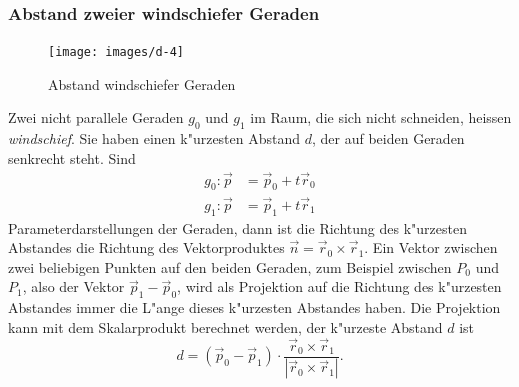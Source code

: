 \subsubsection{Abstand zweier windschiefer Geraden}
\begin{figure}
\begin{center}
\texttt{[image: images/d-4]}
\end{center}
\caption{Abstand windschiefer Geraden\label{windschief}}
\end{figure}
Zwei nicht parallele Geraden $g_0$ und $g_1$ im Raum,
die sich nicht schneiden, heissen
{\em windschief}. 
Sie haben
einen k"urzesten Abstand $d$, der auf beiden Geraden senkrecht steht.
Sind
\begin{align*}
g_0:
\vec p&=\vec p_0+t\vec r_0\\
g_1:
\vec p&=\vec p_1+t\vec r_1
\end{align*}
Parameterdarstellungen der Geraden, dann ist die Richtung des k"urzesten
Abstandes die Richtung des Vektorproduktes $\vec n = \vec r_0\times\vec r_1$. 
Ein Vektor zwischen zwei beliebigen Punkten auf den beiden Geraden,
zum Beispiel zwischen $P_0$ und $P_1$, also der Vektor $\vec p_1-\vec p_0$,
wird als Projektion auf die Richtung des k"urzesten Abstandes immer die
L"ange dieses k"urzesten Abstandes haben. Die Projektion kann mit dem
Skalarprodukt berechnet werden, der k"urzeste Abstand $d$ ist
\[
d=(\vec p_0-\vec p_1)\cdot\frac{\vec r_0\times\vec r_1}{|\vec r_0\times\vec r_1|}.
\]

